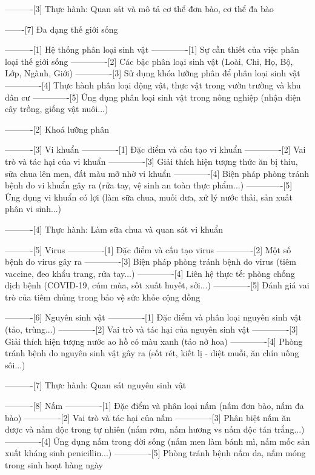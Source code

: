 ----------[3] Thực hành: Quan sát và mô tả cơ thể đơn bào, cơ thể đa bào

-------[7] Đa dạng thế giới sống

----------[1] Hệ thống phân loại sinh vật
-------------[1] Sự cần thiết của việc phân loại thế giới sống
-------------[2] Các bậc phân loại sinh vật (Loài, Chi, Họ, Bộ, Lớp, Ngành, Giới)
-------------[3] Sử dụng khóa lưỡng phân để phân loại sinh vật
-------------[4] Thực hành phân loại động vật, thực vật trong vườn trường và khu dân cư
-------------[5] Ứng dụng phân loại sinh vật trong nông nghiệp (nhận diện cây trồng, giống vật nuôi...)

----------[2] Khoá lưỡng phân

----------[3] Vi khuẩn
-------------[1] Đặc điểm và cấu tạo vi khuẩn
-------------[2] Vai trò và tác hại của vi khuẩn
-------------[3] Giải thích hiện tượng thức ăn bị thiu, sữa chua lên men, đất màu mỡ nhờ vi khuẩn
-------------[4] Biện pháp phòng tránh bệnh do vi khuẩn gây ra (rửa tay, vệ sinh an toàn thực phẩm...)
-------------[5] Ứng dụng vi khuẩn có lợi (làm sữa chua, muối dưa, xử lý nước thải, sản xuất phân vi sinh...)

----------[4] Thực hành: Làm sữa chua và quan sát vi khuẩn

----------[5] Virus
-------------[1] Đặc điểm và cấu tạo virus
-------------[2] Một số bệnh do virus gây ra
-------------[3] Biện pháp phòng tránh bệnh do virus (tiêm vaccine, đeo khẩu trang, rửa tay...)
-------------[4] Liên hệ thực tế: phòng chống dịch bệnh (COVID-19, cúm mùa, sốt xuất huyết, sởi...)
-------------[5] Đánh giá vai trò của tiêm chủng trong bảo vệ sức khỏe cộng đồng

----------[6] Nguyên sinh vật
-------------[1] Đặc điểm và phân loại nguyên sinh vật (tảo, trùng...)
-------------[2] Vai trò và tác hại của nguyên sinh vật
-------------[3] Giải thích hiện tượng nước ao hồ có màu xanh (tảo nở hoa)
-------------[4] Phòng tránh bệnh do nguyên sinh vật gây ra (sốt rét, kiết lị - diệt muỗi, ăn chín uống sôi...)

----------[7] Thực hành: Quan sát nguyên sinh vật

----------[8] Nấm
-------------[1] Đặc điểm và phân loại nấm (nấm đơn bào, nấm đa bào)
-------------[2] Vai trò và tác hại của nấm
-------------[3] Phân biệt nấm ăn được và nấm độc trong tự nhiên (nấm rơm, nấm hương vs nấm độc tán trắng...)
-------------[4] Ứng dụng nấm trong đời sống (nấm men làm bánh mì, nấm mốc sản xuất kháng sinh penicillin...)
-------------[5] Phòng tránh bệnh nấm da, nấm móng trong sinh hoạt hàng ngày

